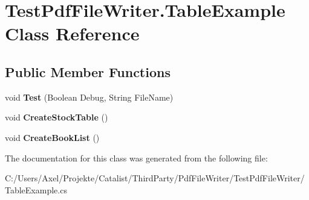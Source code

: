 \hypertarget{class_test_pdf_file_writer_1_1_table_example}{}\section{Test\+Pdf\+File\+Writer.\+Table\+Example Class Reference}
\label{class_test_pdf_file_writer_1_1_table_example}
\subsection*{Public Member Functions}
\begin{DoxyCompactItemize}
\item 
void {\bfseries Test} (Boolean Debug, String File\+Name)\hypertarget{class_test_pdf_file_writer_1_1_table_example_a06db185f63ffe2b1043f8bb96bd2367b}{}\label{class_test_pdf_file_writer_1_1_table_example_a06db185f63ffe2b1043f8bb96bd2367b}

\item 
void {\bfseries Create\+Stock\+Table} ()\hypertarget{class_test_pdf_file_writer_1_1_table_example_a99c0fac44dd356328529f985cf1f2a79}{}\label{class_test_pdf_file_writer_1_1_table_example_a99c0fac44dd356328529f985cf1f2a79}

\item 
void {\bfseries Create\+Book\+List} ()\hypertarget{class_test_pdf_file_writer_1_1_table_example_acd264f85a6599578588b35621a58ab27}{}\label{class_test_pdf_file_writer_1_1_table_example_acd264f85a6599578588b35621a58ab27}

\end{DoxyCompactItemize}


The documentation for this class was generated from the following file\+:\begin{DoxyCompactItemize}
\item 
C\+:/\+Users/\+Axel/\+Projekte/\+Catalist/\+Third\+Party/\+Pdf\+File\+Writer/\+Test\+Pdf\+File\+Writer/Table\+Example.\+cs\end{DoxyCompactItemize}
